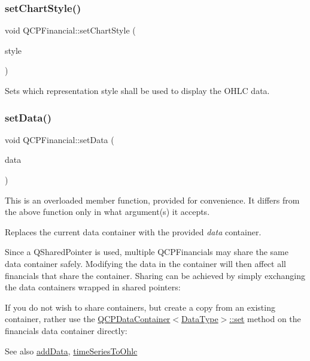 \subsubsection{\texorpdfstring{set\+Chart\+Style()}{setChartStyle()}}
{\footnotesize\ttfamily void Q\+C\+P\+Financial\+::set\+Chart\+Style (\begin{DoxyParamCaption}\item[{\hyperlink{classQCPFinancial_a0f800e21ee98d646dfc6f8f89d10ebfb}{Q\+C\+P\+Financial\+::\+Chart\+Style}}]{style }\end{DoxyParamCaption})}

Sets which representation style shall be used to display the O\+H\+LC data. \mbox{\label{classQCPFinancial_a72089e75b8a50d18097526c3c79fdb85}} 
\subsubsection{\texorpdfstring{set\+Data()}{setData()}\hspace{0.1cm}{\footnotesize\ttfamily [1/2]}}
{\footnotesize\ttfamily void Q\+C\+P\+Financial\+::set\+Data (\begin{DoxyParamCaption}\item[{Q\+Shared\+Pointer$<$ \hyperlink{classQCPDataContainer}{Q\+C\+P\+Financial\+Data\+Container} $>$}]{data }\end{DoxyParamCaption})}

This is an overloaded member function, provided for convenience. It differs from the above function only in what argument(s) it accepts.

Replaces the current data container with the provided {\itshape data} container.

Since a Q\+Shared\+Pointer is used, multiple Q\+C\+P\+Financials may share the same data container safely. Modifying the data in the container will then affect all financials that share the container. Sharing can be achieved by simply exchanging the data containers wrapped in shared pointers\+: 
\begin{DoxyCodeInclude}
\end{DoxyCodeInclude}
 If you do not wish to share containers, but create a copy from an existing container, rather use the \hyperlink{classQCPDataContainer_ae7042bd534fc3ce7befa2ce3f790b5bf}{Q\+C\+P\+Data\+Container$<$\+Data\+Type$>$\+::set} method on the financial\textquotesingle{}s data container directly\+: 
\begin{DoxyCodeInclude}
\end{DoxyCodeInclude}
 \begin{DoxySeeAlso}{See also}
\hyperlink{classQCPFinancial_a372ac031e44a7a6c912d203556af96f7}{add\+Data}, \hyperlink{classQCPFinancial_a9a058c035040d3939b8884f4aaccb1a7}{time\+Series\+To\+Ohlc} 
\end{DoxySeeAlso}
\mbox{\label{classQCPFinancial_a12992e669ed19d7bb48dbe601570cc05}} 

